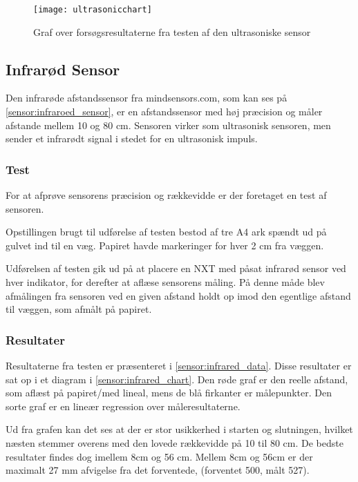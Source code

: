\begin{figure}[h]
\centering
\texttt{[image: ultrasonicchart]}
\caption{Graf over forsøgsresultaterne fra testen af den ultrasoniske sensor}
\label{sensor:ultrasonic_resultat_diagram}
\end{figure}



\subsection{Infrarød Sensor}
Den infrarøde afstandssensor fra mindsensors.com, som kan ses på \cref{sensor:infraroed_sensor}, er en afstandssensor med høj præcision og måler afstande mellem 10 og 80 cm.
Sensoren virker som ultrasonisk sensoren, men sender et infrarødt signal i stedet for en ultrasonisk impuls.\cite{infrared}

\subsubsection{Test}
For at afprøve sensorens præcision og rækkevidde er der foretaget en test af sensoren.

Opstillingen brugt til udførelse af testen bestod af tre A4 ark spændt ud på gulvet ind til en væg. 
Papiret havde markeringer for hver 2 cm fra væggen.

Udførelsen af testen gik ud på at placere en NXT med påsat infrarød sensor ved hver indikator, for derefter at aflæse sensorens måling.
På denne måde blev afmålingen fra sensoren ved en given afstand holdt op imod den egentlige afstand til væggen, som afmålt på papiret.

\subsubsection{Resultater}

Resultaterne fra testen er præsenteret i \cref{sensor:infrared_data}. 
Disse resultater er sat op i et diagram i \cref{sensor:infrared_chart}.
Den røde graf er den reelle afstand, som aflæst på papiret/med lineal, mens de blå firkanter er målepunkter.
Den sorte graf er en lineær regression over måleresultaterne.

Ud fra grafen kan det ses at der er stor usikkerhed i starten og slutningen, hvilket næsten stemmer overens med den lovede rækkevidde på 10 til 80 cm.
De bedste resultater findes dog imellem 8cm og 56 cm. 
Mellem 8cm og 56cm er der maximalt 27 mm afvigelse fra det forventede, (forventet 500, målt 527).
